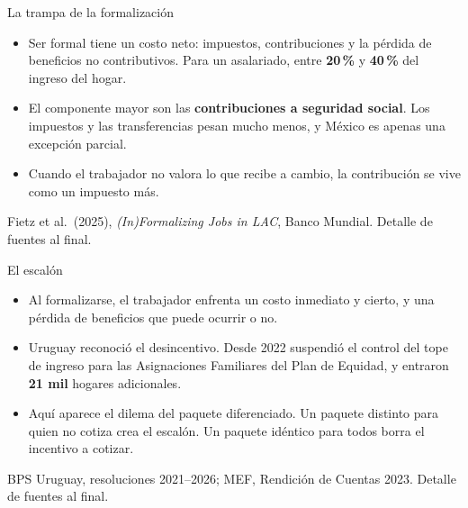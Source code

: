 \documentclass[aspectratio=169,11pt]{beamer}
\newcommand{\cifra}[1]{\textcolor{dato}{\textbf{#1}}}
\newcommand{\clave}[1]{\textcolor{acento}{\textbf{#1}}}
\newcommand{\pie}[1]{\vfill{\scriptsize\textcolor{grisfino}{#1}}}
\begin{document}
\begin{frame}{La trampa de la formalización}
  \begin{itemize}
    \item Ser formal tiene un costo neto: impuestos, contribuciones y la pérdida de beneficios no contributivos. Para un asalariado, entre \cifra{20\,\%} y \cifra{40\,\%} del ingreso del hogar.
    \item El componente mayor son las \clave{contribuciones a seguridad social}. Los impuestos y las transferencias pesan mucho menos, y México es apenas una excepción parcial.
    \item Cuando el trabajador no valora lo que recibe a cambio, la contribución se vive como un impuesto más.
  \end{itemize}
  \pie{Fietz et al.\ (2025), \emph{(In)Formalizing Jobs in LAC}, Banco Mundial. Detalle de fuentes al final.}
\end{frame}

\begin{frame}{El escalón}
  \begin{itemize}
    \item Al formalizarse, el trabajador enfrenta un costo inmediato y cierto, y una pérdida de beneficios que puede ocurrir o no.
    \item Uruguay reconoció el desincentivo. Desde 2022 suspendió el control del tope de ingreso para las Asignaciones Familiares del Plan de Equidad, y entraron \cifra{21 mil} hogares adicionales.
    \item Aquí aparece el dilema del paquete diferenciado. Un paquete distinto para quien no cotiza crea el escalón. Un paquete idéntico para todos borra el incentivo a cotizar.
  \end{itemize}
  \pie{BPS Uruguay, resoluciones 2021--2026; MEF, Rendición de Cuentas 2023. Detalle de fuentes al final.}
\end{frame}

\end{document}
